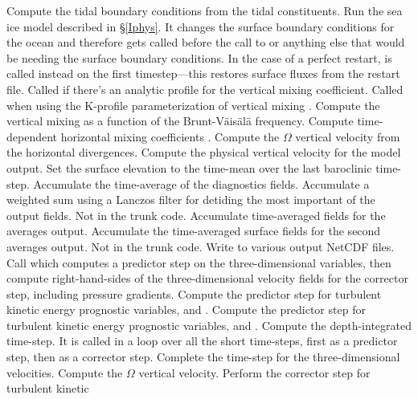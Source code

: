\begin{klist}
   Compute the tidal boundary conditions from the
    tidal constituents.
   Run the sea ice model described in \S\ref{Iphys}. It
    changes the surface boundary conditions for the ocean and therefore
    gets called before the call to  or anything else that
    would be needing the surface boundary conditions. In the case of a
    perfect restart,  is called instead on the
    first timestep---this restores surface fluxes from the restart file.
   Called if there's an analytic profile for the
    vertical mixing coefficient.
   Called when using the K-profile parameterization
    of vertical mixing \citep{Large94,Large98}.
   Compute the vertical mixing as a function of the
    Brunt-V\"ais\"al\"a frequency.
   Compute time-dependent horizontal mixing coefficients
    \citep{S63, Holland_98, Webb_98,Griffies_2000}.
   Compute the $\Omega$ vertical velocity from the horizontal
    divergences.
   Compute the physical vertical velocity for the
    model output.
   Set the surface elevation to the time-mean over the
    last baroclinic time-step.
   Accumulate the time-average of the diagnostics
    fields.
   Accumulate a weighted sum using a Lanczos filter
  for detiding the most important of the output fields. Not in the trunk
  code.
   Accumulate time-averaged fields for the averages
  output.
   Accumulate the time-averaged surface fields for the
  second averages output. Not in the trunk code.
   Write to various output NetCDF files.
   Call  which computes a predictor
  step on the three-dimensional variables, then compute
  right-hand-sides of the three-dimensional velocity fields for the
  corrector step, including pressure gradients.
   Compute the predictor step for turbulent
  kinetic energy prognostic variables,  and .
   Compute the predictor step for turbulent
  kinetic energy prognostic variables,  and .
   Compute the depth-integrated time-step. It is called in
  a loop over all the short time-steps, first as a predictor step, then
  as a corrector step.
   Complete the time-step for the three-dimensional
  velocities.
   Compute the $\Omega$ vertical velocity.
   Perform the corrector step for turbulent kinetic

\end{klist}
